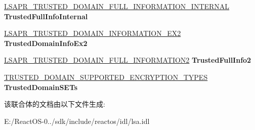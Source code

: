 \begin{DoxyCompactItemize}
\mbox{\label{union___l_s_a_p_r___t_r_u_s_t_e_d___d_o_m_a_i_n___i_n_f_o_af218d56542daae820b16c53bcdfc2b2f}} 
\hyperlink{struct___l_s_a_p_r___t_r_u_s_t_e_d___d_o_m_a_i_n___f_u_l_l___i_n_f_o_r_m_a_t_i_o_n___i_n_t_e_r_n_a_l}{L\+S\+A\+P\+R\+\_\+\+T\+R\+U\+S\+T\+E\+D\+\_\+\+D\+O\+M\+A\+I\+N\+\_\+\+F\+U\+L\+L\+\_\+\+I\+N\+F\+O\+R\+M\+A\+T\+I\+O\+N\+\_\+\+I\+N\+T\+E\+R\+N\+AL} {\bfseries Trusted\+Full\+Info\+Internal}
\item 
\mbox{\label{union___l_s_a_p_r___t_r_u_s_t_e_d___d_o_m_a_i_n___i_n_f_o_aca270f55e0e00adf5b21e41df65f1dc3}} 
\hyperlink{struct___l_s_a_p_r___t_r_u_s_t_e_d___d_o_m_a_i_n___i_n_f_o_r_m_a_t_i_o_n___e_x2}{L\+S\+A\+P\+R\+\_\+\+T\+R\+U\+S\+T\+E\+D\+\_\+\+D\+O\+M\+A\+I\+N\+\_\+\+I\+N\+F\+O\+R\+M\+A\+T\+I\+O\+N\+\_\+\+E\+X2} {\bfseries Trusted\+Domain\+Info\+Ex2}
\item 
\mbox{\label{union___l_s_a_p_r___t_r_u_s_t_e_d___d_o_m_a_i_n___i_n_f_o_a3559e039ff6c40a6b600994cc9b61907}} 
\hyperlink{struct___l_s_a_p_r___t_r_u_s_t_e_d___d_o_m_a_i_n___f_u_l_l___i_n_f_o_r_m_a_t_i_o_n2}{L\+S\+A\+P\+R\+\_\+\+T\+R\+U\+S\+T\+E\+D\+\_\+\+D\+O\+M\+A\+I\+N\+\_\+\+F\+U\+L\+L\+\_\+\+I\+N\+F\+O\+R\+M\+A\+T\+I\+O\+N2} {\bfseries Trusted\+Full\+Info2}
\item 
\mbox{\label{union___l_s_a_p_r___t_r_u_s_t_e_d___d_o_m_a_i_n___i_n_f_o_a51d486d997ed946b09317aac3fe52594}} 
\hyperlink{struct___t_r_u_s_t_e_d___d_o_m_a_i_n___s_u_p_p_o_r_t_e_d___e_n_c_r_y_p_t_i_o_n___t_y_p_e_s}{T\+R\+U\+S\+T\+E\+D\+\_\+\+D\+O\+M\+A\+I\+N\+\_\+\+S\+U\+P\+P\+O\+R\+T\+E\+D\+\_\+\+E\+N\+C\+R\+Y\+P\+T\+I\+O\+N\+\_\+\+T\+Y\+P\+ES} {\bfseries Trusted\+Domain\+S\+E\+Ts}
\end{DoxyCompactItemize}


该联合体的文档由以下文件生成\+:\begin{DoxyCompactItemize}
\item 
E\+:/\+React\+O\+S-\/0../sdk/include/reactos/idl/lsa.\+idl\end{DoxyCompactItemize}

